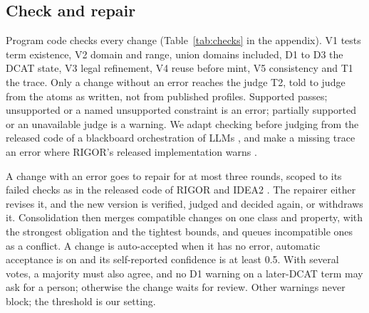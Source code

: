 \subsection{Check and repair}\label{sec:check}

Program code checks every change (Table~\ref{tab:checks} in the appendix). V1 tests term existence, V2 domain %
and range, union domains included, D1 to D3 the \acs{DCAT} state, V3 legal refinement, V4 reuse before mint, V5 %
consistency and T1 the trace. %
Only a change without an error reaches the judge T2, told to judge from the atoms as written, not from published %
profiles. Supported passes; unsupported or a named unsupported constraint is an error; partially supported or an %
unavailable judge is a warning. We adapt checking before judging from the released code of a blackboard %
orchestration of \acp{LLM} \cite{chmielewski2026blackboard},
and make a missing trace an error where RIGOR's released implementation warns \cite{fathallah2026rigor}. %

A change with an error goes to repair for at most three rounds, scoped to its failed checks as in the released %
code of RIGOR and IDEA2 \cite{fathallah2026rigor,alharbi2027idea2}. The repairer either revises it, and the new %
version is verified, judged and decided again, or withdraws it. Consolidation then merges compatible changes %
on one class and property, with the strongest obligation and the tightest bounds, and queues incompatible ones %
as a conflict.
A change is auto-accepted when it has no error, automatic acceptance is on and its self-reported confidence is at %
least 0.5. With several votes, a majority must also agree, and no D1 warning on a later-\acs{DCAT} term may ask
for a person; otherwise the change waits for review. Other warnings never block; the threshold is our setting. %

